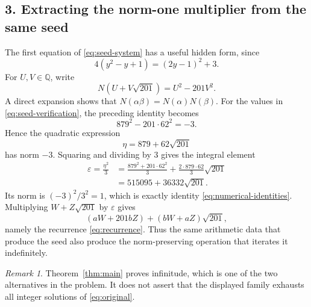 \documentclass[11pt]{article}
\theoremstyle{remark}
\newtheorem{remark}{Remark}
\begin{document}
\subsection*{3. Extracting the norm-one multiplier from the same seed}
The first equation of \eqref{eq:seed-system} has a useful hidden form, since
\[
 4(y^2-y+1)=(2y-1)^2+3.
\]
For $U,V\in\mathbb Q$, write
\[
 N(U+V\sqrt{201})=U^2-201V^2.
\]
A direct expansion shows that $N(\alpha\beta)=N(\alpha)N(\beta)$.  For the values in \eqref{eq:seed-verification}, the preceding identity becomes
\begin{equation}\label{eq:minus-three}
 879^2-201\cdot62^2=-3.
\end{equation}
Hence the quadratic expression
\[
 \eta=879+62\sqrt{201}
\]
has norm $-3$.  Squaring and dividing by $3$ gives the integral element
\begin{align*}
 \varepsilon=\frac{\eta^2}{3}
 &=\frac{879^2+201\cdot62^2}{3}
   +\frac{2\cdot879\cdot62}{3}\sqrt{201}\\
 &=515095+36332\sqrt{201}.
\end{align*}
Its norm is $(-3)^2/3^2=1$, which is exactly identity \eqref{eq:numerical-identities}.  Multiplying $W+Z\sqrt{201}$ by $\varepsilon$ gives
\[
 (aW+201bZ)+(bW+aZ)\sqrt{201},
\]
namely the recurrence \eqref{eq:recurrence}.  Thus the same arithmetic data that produce the seed also produce the norm-preserving operation that iterates it indefinitely.

\begin{remark}
Theorem~\ref{thm:main} proves infinitude, which is one of the two alternatives in the problem.  It does not assert that the displayed family exhausts all integer solutions of \eqref{eq:original}.
\end{remark}
\end{document}
